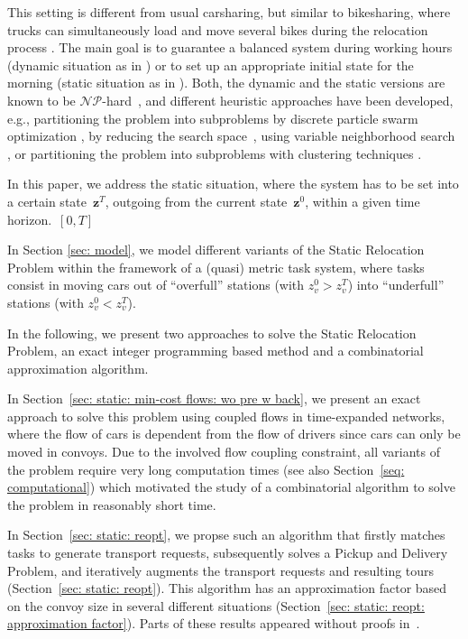 \documentclass[english]{llncs}
\numberwithin{sublemma}{lemma}
\newcommand{\z}{\boldsymbol{z}}
\newcommand{\NPhard}{\ensuremath{\mathcal{NP}}\hbox{-}hard}
\begin{document}
This setting is different from usual carsharing, but similar to bikesharing, where trucks can simultaneously load and move several bikes during the relocation process \cite{Benchimol+etal:RAIRO,do-cmc2013,cirrelt-CMR-2012}.
The main goal is to guarantee a balanced system during working hours (dynamic situation as in \cite{cirrelt-CMR-2012,HKQWW:2015:ODY,HKQWW:LAGOS:2015,KQWW:2014:LNCS,LAGOS2013})
or to set up an appropriate initial state for the morning (static situation as in \cite{do-cmc2013,LAGOS2013}).
Both, the dynamic and the static versions are known to be \NPhard~\cite{Ball+etal:handbook:95a,Ball+etal:handbook:95b,do-cmc2013,Nemhauser+etal:handbook:89}, and different heuristic approaches have been developed, e.g., 
partitioning the problem into subproblems by
discrete particle swarm optimization \cite{CIE:GKA-2013},
by reducing the search space~\cite{KQWW:2014:LNCS},
using variable neighborhood search \cite{EvoCOP:HPHR-2013}, or
partitioning the problem into subproblems with clustering techniques \cite{SHH-2013}.





In this paper, we address the static situation, where the system has to be set into a certain state~$\z^T$, outgoing from the current state~$\z^0$, within a given time horizon.~$[0, T]$ 

In Section \ref{sec: model}, we model different variants of the Static Relocation Problem within the framework of a (quasi) metric task system,
where tasks consist in moving cars out of ``overfull'' stations (with $z^0_v > z^T_v$) into ``underfull'' stations (with $z^0_v < z^T_v$).

In the following, we present two approaches to solve the Static Relocation Problem, an exact integer programming based method and a combinatorial approximation algorithm.

In Section~\ref{sec: static: min-cost flows: wo pre w back}, we present an exact approach to solve this problem using coupled flows in time-expanded networks,
where the flow of cars is dependent from the flow of drivers since cars can only be moved in convoys.
Due to the involved flow coupling constraint, all variants of the problem require very long computation times (see also Section~\ref{seq: computational})
which motivated the study of a combinatorial algorithm to solve the problem in reasonably short time.

In Section~\ref{sec: static: reopt}, we propse such an algorithm that firstly matches tasks to generate transport requests,
subsequently solves a Pickup and Delivery Problem, and iteratively augments the transport requests and resulting tours (Section~\ref{sec: static: reopt}). 
This algorithm has an approximation factor based on the convoy size in several different situations (Section~\ref{sec: static: reopt: approximation factor}).
Parts of these results appeared without proofs in~\cite{LAGOS2013}.
 
\end{document}
